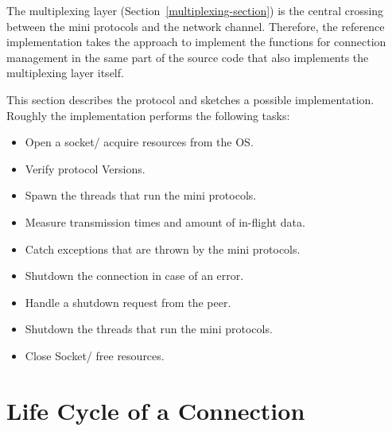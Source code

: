 \documentclass{report}
\newcommand{\state}[1]{\texttt{#1}}
\theoremstyle{definition}{
  \newtheorem{lemma}{Lemma}[section] %
  \newtheorem{definition}[lemma]{Definition}
}
\theoremstyle{theorem}{
  \newtheorem{invariant}[lemma]{Invariant}
  \newtheorem{proofobligation}[lemma]{Proof Obligation}
}
\numberwithin{equation}{lemma}
\begin{document}
The multiplexing layer (Section~\ref{multiplexing-section}) is the central crossing between
the mini protocols and the network channel.
Therefore, the reference implementation takes the approach
to implement the functions for connection management in the same part of the source code
that also implements the multiplexing layer itself.

This section describes the protocol and sketches a possible implementation.
Roughly the implementation performs the following tasks:
\begin{itemize}
\item Open a socket/ acquire resources from the OS.
\item Verify protocol Versions.
\item Spawn the threads that run the mini protocols.
\item Measure transmission times and amount of in-flight data.
\item Catch exceptions that are thrown by the mini protocols.
\item Shutdown the connection in case of an error.
\item Handle a shutdown request from the peer.
\item Shutdown the threads that run the mini protocols.
\item Close Socket/ free resources.
\end{itemize}

\newcommand{\Larval}{\state{Larval}}
\newcommand{\Connected}{\state{Connected}}
\newcommand{\Mature}{\state{Mature}}
\newcommand{\Dying}{\state{Dying}}
\newcommand{\Dead}{\state{Dead}}

\section{Life Cycle of a Connection}
\end{document}
